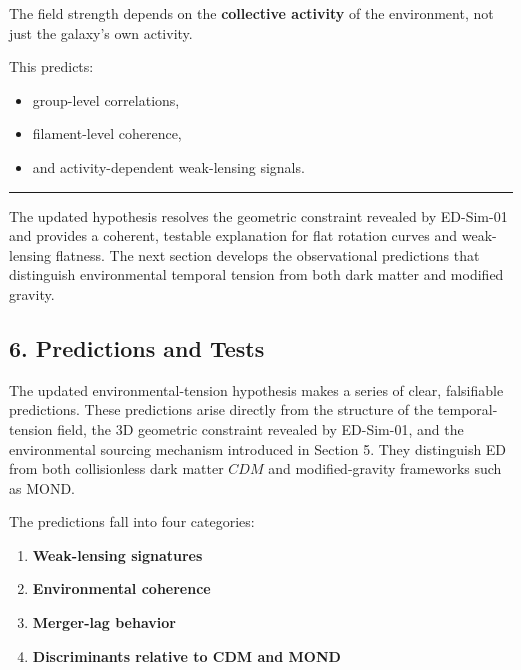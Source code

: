 The field strength depends on the \textbf{collective activity} of the
environment, not just the galaxy's own activity.

This predicts:

\begin{itemize}
\tightlist
\item
  group-level correlations,
\item
  filament-level coherence,
\item
  and activity-dependent weak-lensing signals.
\end{itemize}

\begin{center}\rule{0.5\linewidth}{0.5pt}\end{center}

The updated hypothesis resolves the geometric constraint revealed by
ED-Sim-01 and provides a coherent, testable explanation for flat
rotation curves and weak-lensing flatness. The next section develops the
observational predictions that distinguish environmental temporal
tension from both dark matter and modified gravity.

\subsection{6. Predictions and Tests}\label{predictions-and-tests}

The updated environmental-tension hypothesis makes a series of clear,
falsifiable predictions. These predictions arise directly from the
structure of the temporal-tension field, the 3D geometric constraint
revealed by ED-Sim-01, and the environmental sourcing mechanism
introduced in Section 5. They distinguish ED from both collisionless
dark matter \(CDM\) and modified-gravity frameworks such as MOND.

The predictions fall into four categories:

\begin{enumerate}
\def\labelenumi{\arabic{enumi}.}
\tightlist
\item
  \textbf{Weak-lensing signatures}\\
\item
  \textbf{Environmental coherence}\\
\item
  \textbf{Merger-lag behavior}\\
\item
  \textbf{Discriminants relative to CDM and MOND}
\end{enumerate}

